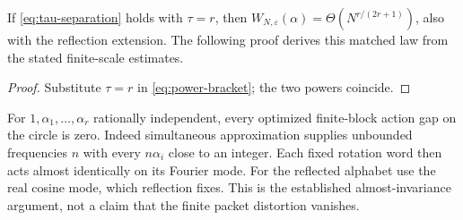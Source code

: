 \begin{corollary}\label{cor:ba}
If \eqref{eq:tau-separation} holds with $\tau=r$, then
$W_{N,\varepsilon}(\alpha)=\Theta(N^{r/(2r+1)})$, also with the reflection extension. The following proof derives this matched law from the stated finite-scale estimates.
\end{corollary}
\begin{proof}
Substitute $\tau=r$ in \eqref{eq:power-bracket}; the two powers coincide.
\end{proof}

For $1,\alpha_1,\ldots,\alpha_r$ rationally independent, every optimized finite-block action gap on the circle is zero. Indeed simultaneous approximation supplies unbounded frequencies $n$ with every $n\alpha_i$ close to an integer. Each fixed rotation word then acts almost identically on its Fourier mode. For the reflected alphabet use the real cosine mode, which reflection fixes. This is the established almost-invariance argument, not a claim that the finite packet distortion vanishes.
